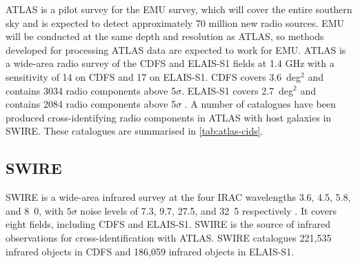 \documentclass[fleqn,usenatbib,usedcolumn]{mnras}
\newcommand{\jansky}{\text{Jy}}
\begin{document}
ATLAS is a pilot survey for the EMU \citep{norris11} survey, which will
    cover the entire southern sky and is expected to detect approximately 70
    million new radio sources. EMU will be conducted at the same depth and
    resolution as ATLAS, so methods developed for processing ATLAS data are
    expected to work for EMU.    ATLAS is a wide-area radio survey of the CDFS and ELAIS-S1
    fields at 1.4 GHz with a sensitivity of
    \unit{14}{\micro\jansky} on CDFS and \unit{17}{\micro\jansky} on ELAIS-S1.
    CDFS covers 3.6~deg$^2$ and contains 3034 radio components above 5$\sigma$.
    ELAIS-S1 covers 2.7~deg$^2$ and contains 2084 radio components above
    5$\sigma$ \citep{franzen15}.  A number of catalogues have been produced cross-identifying radio components
    in ATLAS with host galaxies in SWIRE. These catalogues are summarised in
    \autoref{tab:atlas-cids}.






  \subsection{SWIRE}\label{sec:swire}

    SWIRE \citep{lonsdale03swire, surace05swire} is a wide-area infrared survey
    at the four IRAC wavelengths 3.6, 4.5, 5.8, and
    \unit{8.0}{\micro\meter}, with $5\sigma$ noise levels of 7.3,
    9.7, 27.5, and \unit{32.5}{\micro\jansky} respectively
    \citep{lonsdale03swire}. It covers eight fields, including CDFS and ELAIS-S1. SWIRE is the source of infrared
    observations for cross-identification with ATLAS. SWIRE catalogues 221,535
    infrared objects in CDFS and 186,059 infrared objects in ELAIS-S1.
\end{document}
